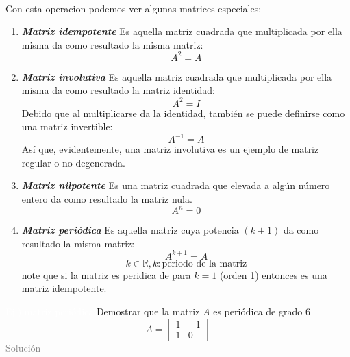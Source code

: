 \hspace*{\fill}\colorbox{gray!55}{ } \\
Con esta operacion podemos ver algunas matrices especiales:
\begin{enumerate}
	\item \textbf{\textit{Matriz idempotente}}
	Es aquella matriz cuadrada que multiplicada por ella misma da como resultado la misma matriz:
	$$ A^2 = A $$
	\item  \textbf{\textit{Matriz involutiva}}
	Es aquella matriz cuadrada que multiplicada por ella misma da como resultado la matriz identidad:
	$$ A^2 = I $$
	Debido que al multiplicarse da la identidad, también se puede definirse como una matriz invertible:
	$$ A^{-1} = A $$
	Así que, evidentemente, una matriz involutiva es un ejemplo de matriz regular o no degenerada.
	\item \textbf{\textit{Matriz nilpotente}}
	Es una matriz cuadrada que elevada a algún número entero da como resultado la matriz nula.
	$$ A^n=0 $$
	\item \textbf{\textit{Matriz periódica}}
	Es aquella matriz cuya potencia $(k+1)$ da como resultado la misma matriz:
	$$ A^{k+1}=A $$ $$ k\in \mathbb{R}, k: \text{periodo de la matriz} $$
	note que si la matriz es peridica de para $k=1$ (orden 1) entonces es una matriz idempotente.
\end{enumerate}
\addtocounter{exr}{1} 
\colorbox{gray!55}{\textcolor{white}{Ej.) matriz periódica}}
	Demostrar que la matriz $A$ es periódica de grado $6$
	$$ A=\begin{bmatrix}
		1 & -1 \\
		1 & 0
	\end{bmatrix} $$
\textcolor{gray}{Solución }
